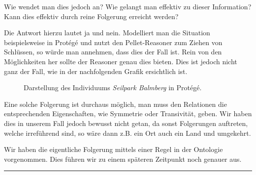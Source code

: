 Wie wendet man dies jedoch an? Wie gelangt man effektiv zu dieser Information? Kann dies effektiv durch reine Folgerung erreicht werden?

Die Antwort hierzu lautet ja und nein. Modelliert man die Situation beispielsweise in Protégé und nutzt den Pellet-Reasoner zum Ziehen von Schlüssen, so würde man annehmen, dass dies der Fall ist. Rein von den Möglichkeiten her sollte der Reasoner genau dies bieten. Dies ist jedoch nicht ganz der Fall, wie in der nachfolgenden Grafik ersichtlich ist.

\begin{figure}[H]
\centering {}
\caption{Darstellung des Individuums \textit{Seilpark Balmberg} in Protégé.\label{fig:inferenz_protege}\protect\footnotemark}
\end{figure}

Eine solche Folgerung ist durchaus möglich, man muss den Relationen die entsprechenden Eigenschaften, wie Symmetrie oder Transivität, geben. Wir haben dies in unserem Fall jedoch bewusst nicht getan, da sonst Folgerungen auftreten, welche irreführend sind, so wäre dann z.B. ein Ort auch ein Land und umgekehrt.

Wir haben die eigentliche Folgerung mittels einer Regel in der Ontologie vorgenommen. Dies führen wir zu einem späteren Zeitpunkt noch genauer aus.

\noindent\rule[1ex]{\textwidth}{1pt}
